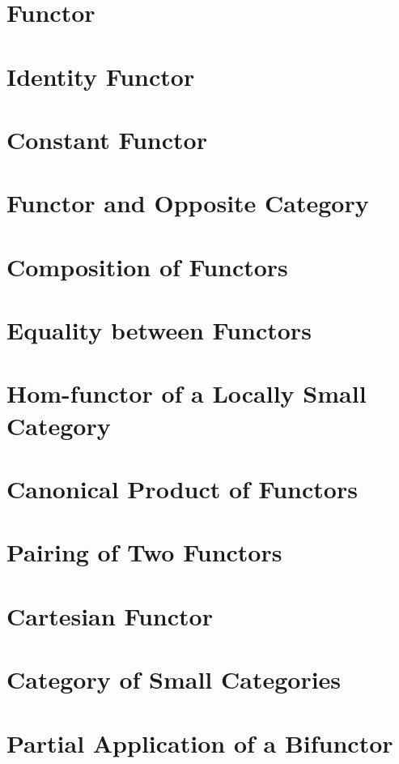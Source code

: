 \section{Functor}
    
\section{Identity Functor}
    
\section{Constant Functor}
    
\section{Functor and Opposite Category}
    
\section{Composition of Functors}
    
\section{Equality between Functors}
    
\section{Hom-functor of a Locally Small Category}
    
\section{Canonical Product of Functors}
    
\section{Pairing of Two Functors}
    
\section{Cartesian Functor}
    
\section{Category of Small Categories}
    
\section{Partial Application of a Bifunctor}
    
